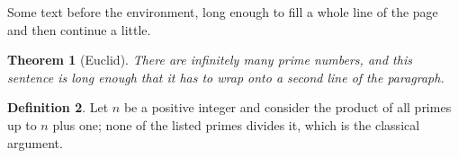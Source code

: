 \documentclass{article}
\newtheorem{theorem}{Theorem}
\theoremstyle{definition}
\newtheorem{definition}[theorem]{Definition}
\begin{document}
Some text before the environment, long enough to fill a whole line of the page and then continue a little.
\begin{theorem}[Euclid]
There are infinitely many prime numbers, and this sentence is long enough that it has to wrap onto a second line of the paragraph.
\end{theorem}
\begin{definition}
Let $n$ be a positive integer and consider the product of all primes up to $n$ plus one; none of the listed primes divides it, which is the classical argument.
\end{definition}
\end{document}
